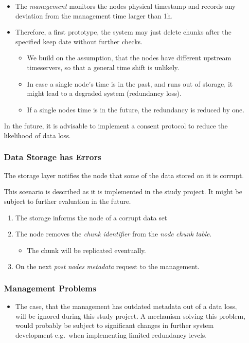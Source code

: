 \begin{itemize}
    \item The \emph{management} monitors the nodes physical timestamp and records any deviation from the management time larger than 1h.
    \item Therefore, a first prototype, the system may just delete chunks after the specified keep date without further checks.
        \begin{itemize}
            \item We build on the assumption, that the nodes have different upstream timeservers, so that a general time shift is unlikely.
            \item In case a single node's time is in the past, and runs out of storage, it might lead to a degraded system (redundancy loss).
            \item If a single nodes time is in the future, the redundancy is reduced by one.
        \end{itemize}
\end{itemize}

In the future, it is advisable to implement a consent protocol to reduce the likelihood of data loss.

\subsubsection{Data Storage has Errors}\label{sec:scenario-storage-errors}
The storage layer notifies the node that some of the data stored on it is corrupt.

This scenario is described as it is implemented in the study project. It might be subject to further evaluation in the future.

\begin{enumerate}
    \item The storage informs the node of a corrupt data set
    \item The node removes the \emph{chunk identifier} from the \emph{node chunk table}.
        \begin{itemize}
            \item The chunk will be replicated eventually.
        \end{itemize}
    \item On the next \emph{post nodes metadata} request to the management.
\end{enumerate}

\subsubsection{Management Problems}\label{sec:scenario-management-problems}
\begin{itemize}
    \item The case, that the management has outdated metadata out of a data loss, will be ignored during this study project. A mechanism solving this problem, would probably be subject to significant changes in further system development e.g.\ when implementing limited redundancy levels. %
\end{itemize}

